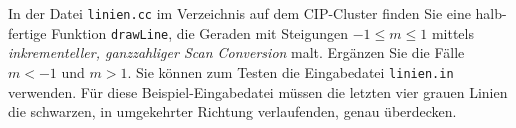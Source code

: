 %
In der Datei \texttt{linien.cc} im Verzeichnis
 auf dem CIP-Cluster finden Sie 
eine halb-fertige Funktion \texttt{drawLine}, die Geraden mit Steigungen 
$-1 ≤ m ≤ 1$ mittels \emph{inkrementeller, ganzzahliger Scan Conversion}
malt. Ergänzen Sie die Fälle $m < -1 $ und $m > 1$. Sie können zum
Testen die Eingabedatei \texttt{linien.in} verwenden. Für diese 
Beispiel-Eingabedatei müssen die letzten vier grauen Linien die 
schwarzen, in umgekehrter Richtung verlaufenden, genau überdecken.
